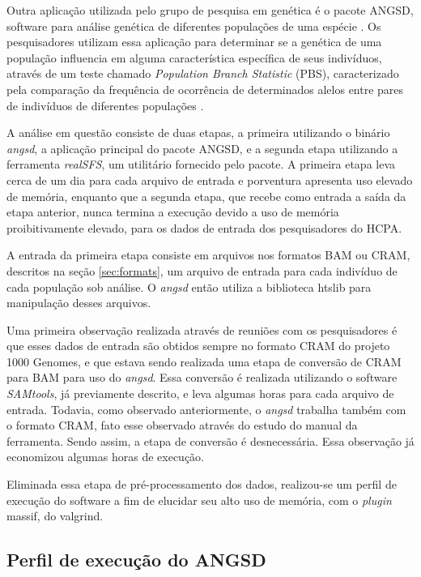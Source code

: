 \documentclass[cic,tc]{iiufrgs}
\begin{document}
Outra aplicação utilizada pelo grupo de pesquisa em genética é o pacote ANGSD,
software para análise genética de diferentes populações de uma
espécie \cite{korneliussen2014angsd}. Os pesquisadores utilizam essa aplicação
para determinar se a genética de uma população influencia em alguma
característica específica de seus indivíduos, através de um teste chamado
\textit{Population Branch Statistic} (PBS), caracterizado pela comparação da
frequência de ocorrência de determinados alelos entre pares de
indivíduos de diferentes populações \cite{yi2010sequencing}.

A análise em questão consiste de duas etapas, a primeira utilizando o binário
\textit{angsd}, a aplicação principal do pacote ANGSD, e a segunda etapa utilizando a
ferramenta \textit{realSFS}, um utilitário fornecido pelo pacote. A primeira etapa leva
cerca de um dia para cada arquivo de entrada e porventura apresenta uso elevado
de memória, enquanto que a segunda etapa, que recebe como entrada a saída da
etapa anterior, nunca termina a execução devido a uso de memória
proibitivamente elevado, para os dados de entrada dos pesquisadores do HCPA.

A entrada da primeira etapa consiste em arquivos nos formatos BAM ou CRAM,
descritos na seção \ref{sec:formats}, um arquivo de entrada para cada indivíduo
de cada população sob análise. O \textit{angsd} então utiliza a biblioteca
htslib para manipulação desses arquivos.

Uma primeira observação realizada através de reuniões com os pesquisadores é
que esses dados de entrada são obtidos sempre no formato CRAM do projeto 1000
Genomes, e que estava sendo realizada uma etapa de conversão de CRAM para BAM
para uso do \textit{angsd}. Essa conversão é realizada utilizando o software
\textit{SAMtools}, já previamente descrito, e leva algumas horas para cada arquivo de
entrada. Todavia, como observado anteriormente, o \textit{angsd} trabalha também com o
formato CRAM, fato esse observado através do estudo do manual da ferramenta.
Sendo assim, a etapa de conversão é desnecessária. Essa observação já
economizou algumas horas de execução.

Eliminada essa etapa de pré-processamento dos dados, realizou-se um perfil de
execução do software a fim de elucidar seu alto uso de memória, com o
\textit{plugin} massif, do valgrind.

\subsection{Perfil de execução do ANGSD}
\end{document}
